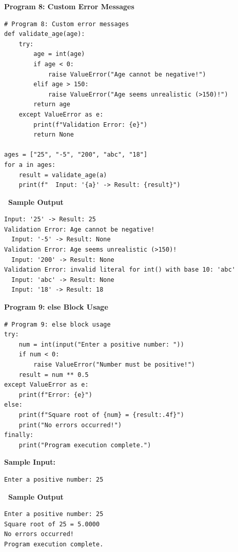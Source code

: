 \documentclass[12pt,a4paper]{article}
\newcommand{\outhead}{\noindent\colorbox{cmrgreen!25}%
  {\textbf{\small\color{cmrdark}~Sample Output~}}\par\vspace{-1pt}}
\begin{document}
\vspace{0.5cm}

\textbf{Program 8: Custom Error Messages}

\begin{lstlisting}
# Program 8: Custom error messages
def validate_age(age):
    try:
        age = int(age)
        if age < 0:
            raise ValueError("Age cannot be negative!")
        elif age > 150:
            raise ValueError("Age seems unrealistic (>150)!")
        return age
    except ValueError as e:
        print(f"Validation Error: {e}")
        return None

ages = ["25", "-5", "200", "abc", "18"]
for a in ages:
    result = validate_age(a)
    print(f"  Input: '{a}' -> Result: {result}")
\end{lstlisting}

\outhead
\begin{lstlisting}[style=outputstyle]
  Input: '25' -> Result: 25
Validation Error: Age cannot be negative!
  Input: '-5' -> Result: None
Validation Error: Age seems unrealistic (>150)!
  Input: '200' -> Result: None
Validation Error: invalid literal for int() with base 10: 'abc'
  Input: 'abc' -> Result: None
  Input: '18' -> Result: 18
\end{lstlisting}

\vspace{0.5cm}

\textbf{Program 9: else Block Usage}

\begin{lstlisting}
# Program 9: else block usage
try:
    num = int(input("Enter a positive number: "))
    if num < 0:
        raise ValueError("Number must be positive!")
    result = num ** 0.5
except ValueError as e:
    print(f"Error: {e}")
else:
    print(f"Square root of {num} = {result:.4f}")
    print("No errors occurred!")
finally:
    print("Program execution complete.")
\end{lstlisting}

\textbf{Sample Input:}
\begin{verbatim}
Enter a positive number: 25
\end{verbatim}

\outhead
\begin{lstlisting}[style=outputstyle]
Enter a positive number: 25
Square root of 25 = 5.0000
No errors occurred!
Program execution complete.
\end{lstlisting}

\vspace{0.5cm}
\end{document}
